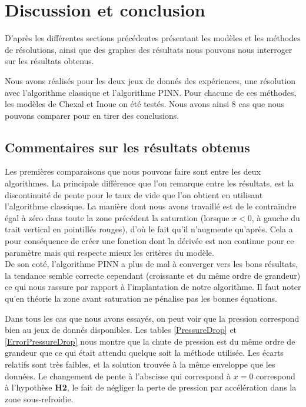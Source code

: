 \section{Discussion et conclusion}
D'après les différentes sections précédentes présentant les modèles et les méthodes de résolutions, ainsi que des graphes des résultats nous pouvons nous interroger sur les résultats obtenus.\\ \par

Nous avons réalisés pour les deux jeux de donnés des expériences, une résolution avec l'algorithme classique et l'algorithme PINN. Pour chacune de ces méthodes, les modèles de Chexal et Inoue on été testés. Nous avons ainsi 8 cas que nous pouvons comparer pour en tirer des conclusions.
\subsection{Commentaires sur les résultats obtenus}
Les premières comparaisons que nous pouvons faire sont entre les deux algorithmes. La principale différence que l'on remarque entre les résultats, est la discontinuité de pente pour le taux de vide que l'on obtient en utilisant l'algorithme classique. La manière dont nous avons travaillé est de le contraindre égal à zéro dans toute la zone précédent la saturation (lorsque $x<0$, à gauche du trait vertical en pointillés rouges), d'où le fait qu'il n'augmente qu'après. Cela a pour conséquence de créer une fonction dont la dérivée est non continue pour ce paramètre mais qui respecte mieux les critères du modèle.\\

De son coté, l'algorithme PINN a plus de mal à converger vers les bons résultats, la tendance semble correcte cependant (croissante et du même ordre de grandeur) ce qui nous rassure par rapport à l'implantation de notre algorithme. Il faut noter qu'en théorie la zone avant saturation ne pénalise pas les \og bonnes\fg{} équations.\\ \par

Dans tous les cas que nous avons essayés, on peut voir que la pression correspond bien au jeux de donnés disponibles. 
Les tables \ref{PressureDrop} et \ref{ErrorPressureDrop} nous montre que la chute de pression est du même ordre de grandeur que ce qui était attendu quelque soit la méthode utilisée. Les écarts relatifs sont très faibles, et la solution trouvée à la même enveloppe que les données. Le changement de pente à l'abscisse qui correspond à $x=0$ correspond à l'hypothèse \textbf{H2}, le fait de négliger la perte de pression par accélération dans la zone sous-refroidie.\\


